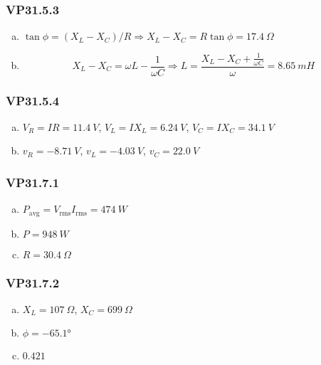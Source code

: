 \documentclass{article}
\begin{document}
\subsubsection{VP31.5.3}

\begin{enumerate}[(a)]
  \item $\tan \phi = (X_L - X_C) / R \Rightarrow X_L - X_C = R \tan \phi = \qty{17.4}{\Omega}$

  \item \[X_L - X_C = \omega L - \frac{1}{\omega C} \Rightarrow L = \frac{X_L - X_C + \frac{1}{\omega C}}{\omega} = \qty{8.65}{mH}\]
\end{enumerate}

\subsubsection{VP31.5.4}

\begin{enumerate}[(a)]
  \item $V_R = I R = \qty{11.4}{V}$, $V_L = I X_L = \qty{6.24}{V}$, $V_C = I X_C = \qty{34.1}{V}$

  \item $v_R = \qty{-8.71}{V}$, $v_L = \qty{-4.03}{V}$, $v_C = \qty{22.0}{V}$
\end{enumerate}

\subsubsection{VP31.7.1}

\begin{enumerate}[(a)]
  \item $P_\text{avg} = V_\text{rms} I_\text{rms} = \qty{474}{W}$

  \item $P = \qty{948}{W}$

  \item $R = \qty{30.4}{\Omega}$
\end{enumerate}

\subsubsection{VP31.7.2}

\begin{enumerate}[(a)]
  \item $X_L = \qty{107}{\Omega}$, $X_C = \qty{699}{\Omega}$

  \item $\phi = \ang{-65.1}$

  \item $0.421$
\end{enumerate}
\end{document}
